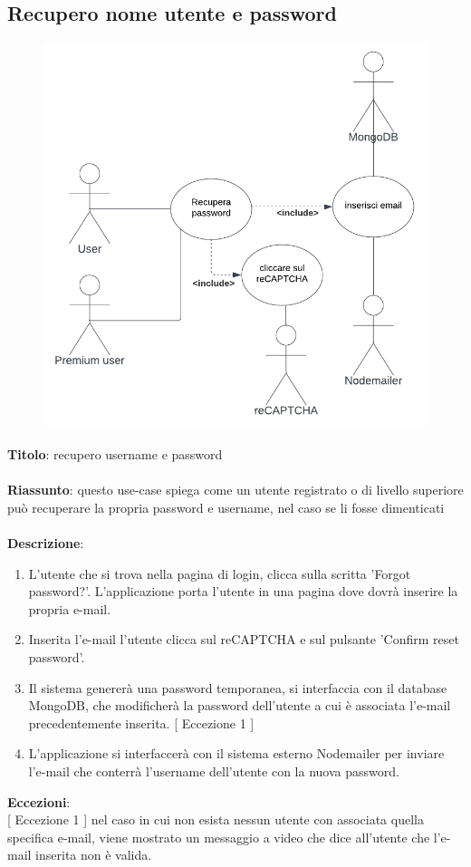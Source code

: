 \subsection{Recupero nome utente e password} \label{req_recupero_nome_utente_e_password}
\begin{figure}[!h]
\centering
\includegraphics[scale=0.30]{images/use_case_recupero_password.png}
\end{figure}
\noindent
\textbf{Titolo}: recupero username e password \\
\\
\textbf{Riassunto}: questo use-case spiega come un utente registrato o di livello superiore può recuperare la propria password e username, nel caso se li fosse dimenticati \\
\\
\textbf{Descrizione}:
\begin{enumerate}
    \item L'utente che si trova nella pagina di login, clicca sulla scritta 'Forgot password?'. L'applicazione porta l'utente in una pagina dove dovrà inserire la propria e-mail.
    \item Inserita l'e-mail l'utente clicca sul reCAPTCHA e sul pulsante 'Confirm reset password'.
    \item Il sistema genererà una password temporanea, si interfaccia con il database MongoDB, che modificherà la password dell'utente a cui è associata l'e-mail precedentemente inserita. {[ Eccezione 1 ]}
    \item L'applicazione si interfaccerà con il sistema esterno Nodemailer per inviare l'e-mail che conterrà l'username dell'utente con la nuova password.
\end{enumerate}
\textbf{Eccezioni}: \\
{[ Eccezione 1 ]} nel caso in cui non esista nessun utente con associata quella specifica e-mail, viene mostrato un messaggio a video che dice all'utente che l'e-mail inserita non è valida. \\
\newpage

